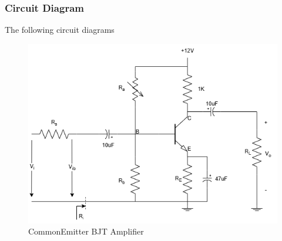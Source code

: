     \subsubsection{Circuit Diagram}
        The following circuit diagrams 
        \begin{figure}[H]
            \centering
            \includegraphics[width=0.5\linewidth]{Experiment_06/Circuit/Lab6.drawio.png}
            \caption{Common\-Emitter BJT Amplifier}
            \label{cir:6main}
        \end{figure}

